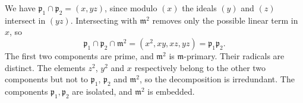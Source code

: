 We have $\mathfrak{p}_1\cap\mathfrak{p}_2=(x,yz)$, since modulo $(x)$ the ideals $(y)$ and $(z)$ intersect in $(yz)$. Intersecting with $\mathfrak{m}^2$ removes only the possible linear term in $x$, so
\[\mathfrak{p}_1\cap\mathfrak{p}_2\cap\mathfrak{m}^2=(x^2,xy,xz,yz)=\mathfrak{p}_1\mathfrak{p}_2.\]
The first two components are prime, and $\mathfrak{m}^2$ is $\mathfrak{m}$-primary. Their radicals are distinct. The elements $z^2$, $y^2$ and $x$ respectively belong to the other two components but not to $\mathfrak{p}_1$, $\mathfrak{p}_2$ and $\mathfrak{m}^2$, so the decomposition is irredundant. The components $\mathfrak{p}_1,\mathfrak{p}_2$ are isolated, and $\mathfrak{m}^2$ is embedded.
